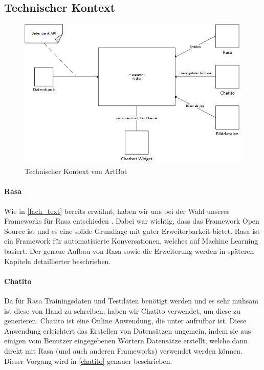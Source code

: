 \subsection{Technischer Kontext}
\begin{figure}[H]
	\centerline{\includegraphics[width=0.9\linewidth]{figures/techKontext.png}}
	\caption{Technischer Kontext von ArtBot}
	\label{techKontext}
\end{figure}

\paragraph{Rasa}
Wie in \ref{fach_text} bereits erwähnt, haben wir uns bei der Wahl unseres Frameworks für Rasa entschieden \cite{rasa_mainpage}. Dabei war wichtig, dass das Framework Open Source ist und es eine solide Grundlage mit guter Erweiterbarkeit bietet. Rasa ist ein Framework für automatisierte Konversationen, welches auf Machine Learning basiert. Der genaue Aufbau von Rasa sowie die Erweiterung werden in späteren Kapiteln detaillierter beschrieben.

\paragraph{Chatito}
Da für Rasa Trainingsdaten und Testdaten benötigt werden und es sehr mühsam ist diese von Hand zu schreiben, haben wir Chatito verwendet, um diese zu generieren. Chatito ist eine Online Anwendung, die unter \cite{chatito_ide} aufrufbar ist. Diese Anwendung erleichtert das Erstellen von Datensätzen ungemein, indem sie aus einigen vom Benutzer eingegebenen Wörtern Datensätze erstellt, welche dann direkt mit Rasa (und auch anderen Frameworks) verwendet werden können. Dieser Vorgang wird in \ref{chatito} genauer beschrieben.

